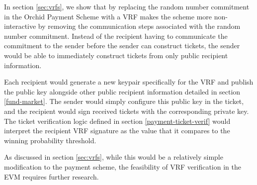In section \ref{sec:vrfs}, we show that by replacing the random number commitment in the Orchid Payment Scheme with a VRF makes the scheme more non-interactive by removing the communication steps associated with the random number commitment. Instead of the recipient having to communicate the commitment to the sender before the sender can construct tickets, the sender would be able to immediately construct tickets from only public recipient information.

Each recipient would generate a new keypair specifically for the VRF and publish the public key alongside other public recipient information detailed in section \ref{fund-market}. The sender would simply configure this public key in the ticket, and the recipient would sign received tickets with the corresponding private key. The ticket verification logic defined in section \ref{payment-ticket-verif} would interpret the recipient VRF signature as the value that it compares to the winning probability threshold.

As discussed in section \ref{sec:vrfs}, while this would be a relatively simple modification to the payment scheme, the feasibility of VRF verification in the EVM requires further research.






\clearpage